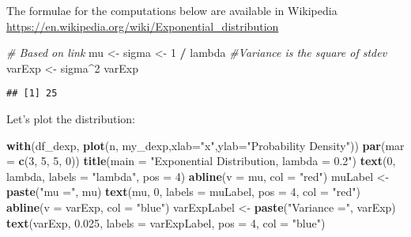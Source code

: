 \documentclass[]{article}
\newenvironment{Shaded}{\begin{snugshade}}{\end{snugshade}}
\newcommand{\CommentTok}[1]{\textcolor[rgb]{0.56,0.35,0.01}{\textit{#1}}}
\newcommand{\DataTypeTok}[1]{\textcolor[rgb]{0.13,0.29,0.53}{#1}}
\newcommand{\DecValTok}[1]{\textcolor[rgb]{0.00,0.00,0.81}{#1}}
\newcommand{\FloatTok}[1]{\textcolor[rgb]{0.00,0.00,0.81}{#1}}
\newcommand{\KeywordTok}[1]{\textcolor[rgb]{0.13,0.29,0.53}{\textbf{#1}}}
\newcommand{\NormalTok}[1]{#1}
\newcommand{\OperatorTok}[1]{\textcolor[rgb]{0.81,0.36,0.00}{\textbf{#1}}}
\newcommand{\StringTok}[1]{\textcolor[rgb]{0.31,0.60,0.02}{#1}}
\begin{document}
The formulae for the computations below are available in Wikipedia
\url{https://en.wikipedia.org/wiki/Exponential_distribution}

\begin{Shaded}
\begin{Highlighting}[]
\CommentTok{# Based on link  }
\NormalTok{mu <-}\StringTok{ }\NormalTok{sigma <-}\StringTok{ }\DecValTok{1} \OperatorTok{/}\StringTok{ }\NormalTok{lambda}
\CommentTok{#Variance is the square of stdev}
\NormalTok{varExp <-}\StringTok{ }\NormalTok{sigma}\OperatorTok{^}\DecValTok{2}
\NormalTok{varExp}
\end{Highlighting}
\end{Shaded}

\begin{verbatim}
## [1] 25
\end{verbatim}

Let's plot the distribution:

\begin{Shaded}
\begin{Highlighting}[]
\KeywordTok{with}\NormalTok{(df_dexp, }\KeywordTok{plot}\NormalTok{(n, my_dexp,}\DataTypeTok{xlab=}\StringTok{"x"}\NormalTok{,}\DataTypeTok{ylab=}\StringTok{"Probability Density"}\NormalTok{))}
\KeywordTok{par}\NormalTok{(}\DataTypeTok{mar =} \KeywordTok{c}\NormalTok{(}\DecValTok{3}\NormalTok{, }\DecValTok{5}\NormalTok{, }\DecValTok{5}\NormalTok{, }\DecValTok{0}\NormalTok{))}
\KeywordTok{title}\NormalTok{(}\DataTypeTok{main =} \StringTok{"Exponential Distribution, lambda = 0.2"}\NormalTok{)}
\KeywordTok{text}\NormalTok{(}\DecValTok{0}\NormalTok{, lambda, }\DataTypeTok{labels =} \StringTok{"lambda"}\NormalTok{, }\DataTypeTok{pos =} \DecValTok{4}\NormalTok{)}
\KeywordTok{abline}\NormalTok{(}\DataTypeTok{v =}\NormalTok{ mu, }\DataTypeTok{col =} \StringTok{"red"}\NormalTok{)}
\NormalTok{muLabel <-}\StringTok{ }\KeywordTok{paste}\NormalTok{(}\StringTok{"mu ="}\NormalTok{, mu)}
\KeywordTok{text}\NormalTok{(mu, }\DecValTok{0}\NormalTok{, }\DataTypeTok{labels =}\NormalTok{ muLabel, }\DataTypeTok{pos =} \DecValTok{4}\NormalTok{, }\DataTypeTok{col =} \StringTok{"red"}\NormalTok{)}
\KeywordTok{abline}\NormalTok{(}\DataTypeTok{v =}\NormalTok{ varExp, }\DataTypeTok{col =} \StringTok{"blue"}\NormalTok{)}
\NormalTok{varExpLabel <-}\StringTok{ }\KeywordTok{paste}\NormalTok{(}\StringTok{"Variance ="}\NormalTok{, varExp)}
\KeywordTok{text}\NormalTok{(varExp, }\FloatTok{0.025}\NormalTok{, }\DataTypeTok{labels =}\NormalTok{ varExpLabel, }\DataTypeTok{pos =} \DecValTok{4}\NormalTok{, }
     \DataTypeTok{col =} \StringTok{"blue"}\NormalTok{)}
\end{Highlighting}
\end{Shaded}
\end{document}

